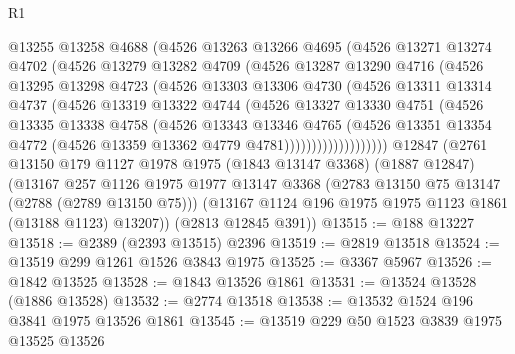\begin{lexlean}{R1}
\begin{coremodule}
                @13255
                @13258
                @4688
                (@4526
                  @13263
                  @13266
                  @4695
                  (@4526
                    @13271
                    @13274
                    @4702
                    (@4526
                      @13279
                      @13282
                      @4709
                      (@4526
                        @13287
                        @13290
                        @4716
                        (@4526
                          @13295
                          @13298
                          @4723
                          (@4526
                            @13303
                            @13306
                            @4730
                            (@4526
                              @13311
                              @13314
                              @4737
                              (@4526
                                @13319
                                @13322
                                @4744
                                (@4526
                                  @13327
                                  @13330
                                  @4751
                                  (@4526
                                    @13335
                                    @13338
                                    @4758
                                    (@4526
                                      @13343
                                      @13346
                                      @4765
                                      (@4526
                                        @13351
                                        @13354
                                        @4772
                                        (@4526 @13359 @13362 @4779 @4781)))))))))))))))))))
    @12847
    (@2761
      @13150
      @179
      @1127
      @1978
      @1975
      (@1843 @13147 @3368)
      (@1887 @12847)
      (@13167
        @257
        @1126
        @1975
        @1977
        @13147
        @3368
        (@2783 @13150 @75 @13147 (@2788 (@2789 @13150 @75)))
        (@13167 @1124 @196 @1975 @1975 @1123 @1861 (@13188 @1123) @13207))
      (@2813 @12845 @391))
@13515 := @188 @13227
@13518 := @2389 (@2393 @13515) @2396
@13519 := @2819 @13518
@13524 := @13519 @299 @1261 @1526 @3843 @1975
@13525 := @3367 @5967
@13526 := @1842 @13525
@13528 := @1843 @13526 @1861
@13531 := @13524 @13528 (@1886 @13528)
@13532 := @2774 @13518
@13538 := @13532 @1524 @196 @3841 @1975 @13526 @1861
@13545 := @13519 @229 @50 @1523 @3839 @1975 @13525 @13526

\end{coremodule}
\end{lexlean}
